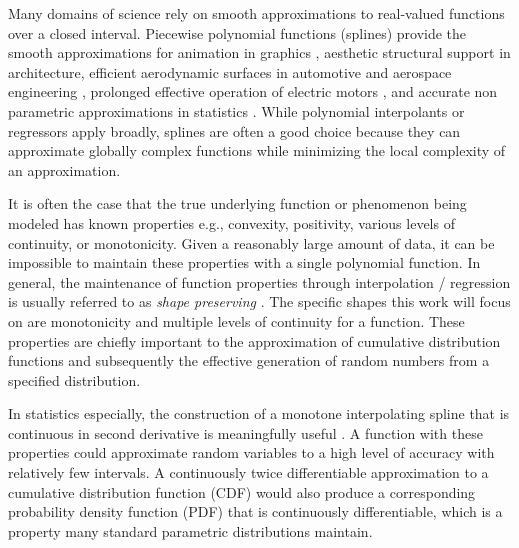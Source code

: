 \documentclass{scspaperproc}
\theoremstyle{scsthe}
\begin{document}


Many domains of science rely on smooth approximations to real-valued functions over a closed interval. Piecewise polynomial functions (splines) provide the smooth approximations for animation in graphics \cite{herman2015techniques,quint2003scalable}, aesthetic structural support in architecture, efficient aerodynamic surfaces in automotive and aerospace engineering \cite{brennan2019measure}, prolonged effective operation of electric motors \cite{berglund2009planning}, and accurate non parametric approximations in statistics \cite{knott2012interpolating}. While polynomial interpolants or regressors apply broadly, splines are often a good choice because they can approximate globally complex functions while minimizing the local complexity of an approximation.

It is often the case that the true underlying function or phenomenon being modeled has known properties e.g., convexity, positivity, various levels of continuity, or monotonicity. Given a reasonably large amount of data, it can be impossible to maintain these properties with a single polynomial function. In general, the maintenance of function properties through interpolation / regression is usually referred to as \textit{shape preserving} \cite{fritsch1980monotone,gregory1985shape}. The specific shapes this work will focus on are monotonicity and multiple levels of continuity for a function. These properties are chiefly important to the approximation of cumulative distribution functions and subsequently the effective generation of random numbers from a specified distribution. 

In statistics especially, the construction of a monotone interpolating spline that is continuous in second derivative is meaningfully useful \cite{ramsay1988monotone}. A function with these properties could approximate random variables to a high level of accuracy with relatively few intervals. A continuously twice differentiable approximation to a cumulative distribution function (CDF) would also produce a corresponding probability density function (PDF) that is continuously differentiable, which is a property many standard parametric distributions maintain.
\end{document}
